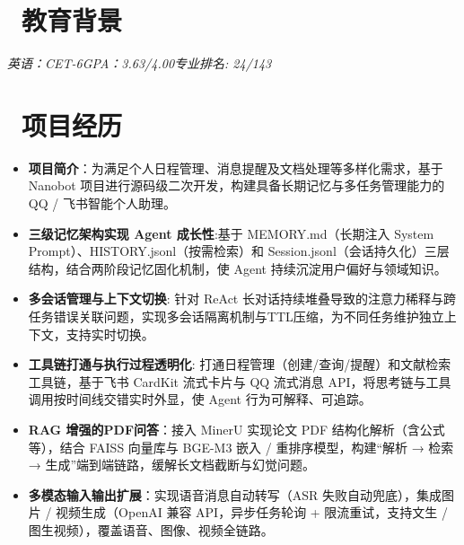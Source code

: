 \documentclass{resume}
\begin{document}

\resumeHeader


\vspace{-0.3em}

\section{\texorpdfstring{\faGraduationCap\ 教育背景}{教育背景}}
\textit{英语：CET-6}\quad\textit{GPA：3.63/4.00}\quad\textit{专业排名: 24/143}

\section{\texorpdfstring{\faUsers\ 项目经历}{项目经历}}
\begin{itemize}
  \item \textbf{项目简介}：为满足个人日程管理、消息提醒及文档处理等多样化需求，基于 Nanobot 项目进行源码级二次开发，构建具备长期记忆与多任务管理能力的 QQ / 飞书智能个人助理。
  \item \textbf{三级记忆架构实现 Agent 成长性}:基于 MEMORY.md（长期注入 System Prompt）、HISTORY.jsonl（按需检索）和 Session.jsonl（会话持久化）三层结构，结合两阶段记忆固化机制，使 Agent 持续沉淀用户偏好与领域知识。
  \item \textbf{多会话管理与上下文切换}: 针对 ReAct 长对话持续堆叠导致的注意力稀释与跨任务错误关联问题，实现多会话隔离机制与TTL压缩，为不同任务维护独立上下文，支持实时切换。
  \item \textbf{工具链打通与执行过程透明化}: 打通日程管理（创建/查询/提醒）和文献检索工具链，基于飞书 CardKit 流式卡片与 QQ 流式消息 API，将思考链与工具调用按时间线交错实时外显，使 Agent 行为可解释、可追踪。
  \item \textbf{RAG 增强的PDF问答}：接入 MinerU 实现论文 PDF 结构化解析（含公式等），结合 FAISS 向量库与 BGE-M3 嵌入 / 重排序模型，构建“解析 → 检索 → 生成”端到端链路，缓解长文档截断与幻觉问题。
  \item \textbf{多模态输入输出扩展}：实现语音消息自动转写（ASR 失败自动兜底），集成图片 / 视频生成（OpenAI 兼容 API，异步任务轮询 + 限流重试，支持文生 / 图生视频），覆盖语音、图像、视频全链路。
\end{itemize}
\end{document}
